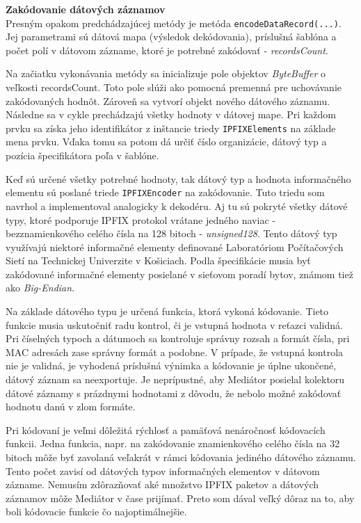 \textbf{Zakódovanie dátových záznamov} \\
Presným opakom predchádzajúcej metódy je metóda \verb|encodeDataRecord(...)|. Jej parametrami sú dátová 
mapa (výsledok dekódovania), príslušná šablóna a počet polí v dátovom zázname, ktoré je potrebné 
zakódovať - \emph{recordsCount}.

Na začiatku vykonávania metódy sa inicializuje pole objektov \emph{ByteBuffer} o veľkosti recordsCount.
Toto pole slúži ako pomocná premenná pre uchovávanie zakódovaných hodnôt. Zároveň sa vytvorí objekt 
nového dátového záznamu.
Následne sa v cykle prechádzajú všetky hodnoty v dátovej mape. Pri každom prvku sa získa jeho identifikátor
z inštancie triedy \verb|IPFIXElements| na základe mena prvku. Vďaka tomu sa potom dá určiť číslo
organizácie, dátový typ a pozícia špecifikátora poľa v šablóne. 

Keď sú určené všetky potrebné hodnoty, tak dátový typ a hodnota informačného elementu sú poslané triede 
\verb|IPFIXEncoder| na zakódovanie. Tuto triedu som navrhol a implementoval analogicky k dekodéru. 
Aj tu sú pokryté všetky dátové typy, ktoré podporuje IPFIX protokol vrátane jedného naviac - bezznamienkového
celého čísla na 128 bitoch - \emph{unsigned128}. Tento dátový typ využívajú niektoré informačné elementy 
definované Laboratóriom Počítačových Sietí na Technickej Univerzite v Košiciach. Podla špecifikácie
\citep{rfc5101} musia byť zakódované informačné elementy posielané v sieťovom poradí bytov, známom 
tiež ako \emph{Big-Endian}. 

Na základe dátového typu je určená funkcia, ktorá vykoná kódovanie. 
Tieto funkcie musia uskutočniť radu kontrol, či je vstupná hodnota v reťazci validná. 
Pri číselných typoch a dátumoch sa kontroluje správny rozsah a formát čísla, pri MAC adresách zase 
správny formát a podobne.
V prípade, že vstupná kontrola nie je validná, je vyhodená príslušná výnimka a 
kódovanie je úplne ukončené, dátový záznam sa neexportuje. Je neprípustné, aby Mediátor posielal kolektoru
dátové záznamy s prázdnymi hodnotami z dôvodu, že nebolo možné zakódovať hodnotu danú v zlom formáte.  

Pri kódovaní je veľmi dôležitá rýchlosť a pamäťová 
nenáročnosť kódovacích funkcii. Jedna funkcia, napr. na zakódovanie znamienkového celého čísla na 32
bitoch môže byť zavolaná veľakrát v rámci kódovania jediného dátového záznamu. Tento počet zavisí od 
dátových typov informačných elementov v dátovom zázname. Nemusím zdôrazňovať aké množstvo IPFIX paketov 
a dátových záznamov môže Mediátor v čase prijímať. Preto som dával veľký dôraz na to, aby boli 
kódovacie funkcie čo najoptimálnejšie. 

